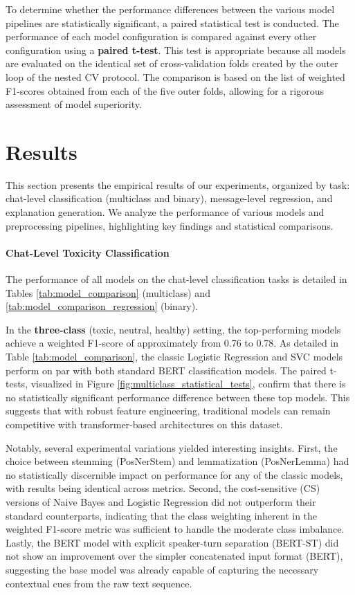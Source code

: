 \documentclass[twocolumn]{ceurart}
\begin{document}
To determine whether the performance differences between the various model pipelines are statistically significant, a paired statistical test is conducted. The performance of each model configuration is compared against every other configuration using a \textbf{paired t-test}. This test is appropriate because all models are evaluated on the identical set of cross-validation folds created by the outer loop of the nested CV protocol. The comparison is based on the list of weighted F1-scores obtained from each of the five outer folds, allowing for a rigorous assessment of model superiority.

\section{Results}

This section presents the empirical results of our experiments, organized by task: chat-level classification (multiclass and binary), message-level regression, and explanation generation. We analyze the performance of various models and preprocessing pipelines, highlighting key findings and statistical comparisons.

\paragraph{Chat-Level Toxicity Classification}

The performance of all models on the chat-level classification tasks is detailed in Tables \ref{tab:model_comparison} (multiclass) and \ref{tab:model_comparison_regression} (binary).

In the \textbf{three-class} (toxic, neutral, healthy) setting, the top-performing models achieve a weighted F1-score of approximately from 0.76 to 0.78. As detailed in Table \ref{tab:model_comparison}, the classic Logistic Regression and SVC models perform on par with both standard BERT classification models. The paired t-tests, visualized in Figure \ref{fig:multiclass_statistical_tests}, confirm that there is no statistically significant performance difference between these top models. This suggests that with robust feature engineering, traditional models can remain competitive with transformer-based architectures on this dataset.

Notably, several experimental variations yielded interesting insights. First, the choice between stemming (PosNerStem) and lemmatization (PosNerLemma) had no statistically discernible impact on performance for any of the classic models, with results being identical across metrics. Second, the cost-sensitive (CS) versions of Naive Bayes and Logistic Regression did not outperform their standard counterparts, indicating that the class weighting inherent in the weighted F1-score metric was sufficient to handle the moderate class imbalance. Lastly, the BERT model with explicit speaker-turn separation (BERT-ST) did not show an improvement over the simpler concatenated input format (BERT), suggesting the base model was already capable of capturing the necessary contextual cues from the raw text sequence.
\end{document}
